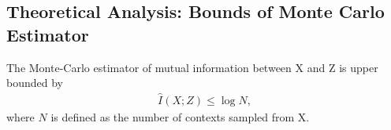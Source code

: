 \documentclass{article} %
\begin{document}

\subsection{Theoretical Analysis: Bounds of Monte Carlo Estimator}
\label{sec:mutual-information-bounds}
\begin{theorem}
The Monte-Carlo estimator of mutual information between X and Z is upper bounded by 
\begin{align*}
    \hat{I}(X;Z) \leq \log N,
\end{align*}
where $N$ is defined as the number of contexts sampled from X.
\end{theorem}
\end{document}
